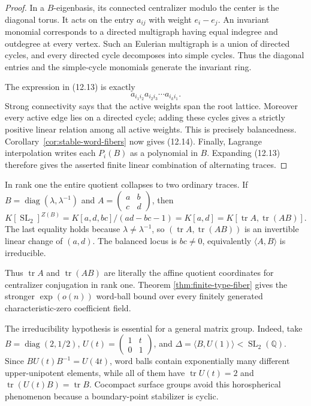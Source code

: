 \documentclass[11pt,reqno]{amsart}
\theoremstyle{definition}
\theoremstyle{remark}
\newcommand{\Q}{\mathbb Q}
\newcommand{\Tr}{\operatorname{tr}}
\newcommand{\SL}{\operatorname{SL}}
\newcommand{\diag}{\operatorname{diag}}
\begin{document}
\begin{proof}
In a \(B\)-eigenbasis, its connected centralizer modulo the center is the
diagonal torus.  It acts on the entry \(a_{ij}\) with weight \(e_i-e_j\).
An invariant monomial corresponds to a directed multigraph having equal
indegree and outdegree at every vertex.  Such an Eulerian multigraph is a
union of directed cycles, and every directed cycle decomposes into simple
cycles.  Thus the diagonal entries and the simple-cycle monomials generate
the invariant ring.

The expression in (12.13) is exactly
\[
 a_{i_1i_2}a_{i_2i_3}\cdots a_{i_ki_1}.
\]
Strong connectivity says that the active weights span the root lattice.
Moreover every active edge lies on a directed cycle; adding these cycles
gives a strictly positive linear relation among all active weights.  This is
precisely balancedness.  Corollary~\ref{cor:stable-word-fibers} now gives
(12.14).  Finally, Lagrange interpolation writes each \(P_i(B)\) as a
polynomial in \(B\).  Expanding (12.13) therefore gives the asserted finite
linear combination of alternating traces.
\end{proof}

In rank one the entire quotient collapses to two ordinary traces.  If
\(B=\diag(\lambda,\lambda^{-1})\) and
\(A=(\begin{smallmatrix}a&b\\c&d\end{smallmatrix})\), then
\[
 K[\SL_2]^{Z(B)}
 =K[a,d,bc]/(ad-bc-1)=K[a,d]
 =K[\Tr A,\Tr(AB)].
\tag{12.15}
\]
The last equality holds because \(\lambda\ne\lambda^{-1}\), so
\((\Tr A,\Tr(AB))\) is an invertible linear change of \((a,d)\).
The balanced locus is \(bc\ne0\), equivalently
\(\langle A,B\rangle\) is irreducible.

Thus \(\Tr A\) and \(\Tr(AB)\) are literally the affine quotient
coordinates for centralizer conjugation in rank one.  Theorem
\ref{thm:finite-type-fiber} gives the stronger
\(\exp(o(n))\) word-ball bound over every finitely generated
characteristic-zero coefficient field.

The irreducibility hypothesis is essential for a general matrix group.
Indeed, take \(B=\diag(2,1/2)\), \(U(t)=
(\begin{smallmatrix}1&t\\0&1\end{smallmatrix})\), and
\(\Delta=\langle B,U(1)\rangle<\SL_2(\Q)\).  Since
\(BU(t)B^{-1}=U(4t)\), word balls contain exponentially many different
upper-unipotent elements, while all of them have
\(\Tr U(t)=2\) and \(\Tr(U(t)B)=\Tr B\).  Cocompact surface groups avoid
this horospherical phenomenon because a boundary-point stabilizer is cyclic.
\end{document}
